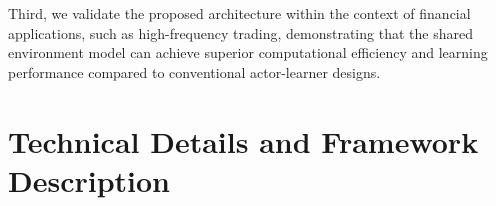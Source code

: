Third, we validate the proposed architecture within the context of financial applications,
such as high-frequency trading, demonstrating that the shared environment
model can achieve superior computational efficiency and learning performance compared to conventional actor-learner designs.




\section{Technical Details and Framework Description}
\label{sec:technical_details}




